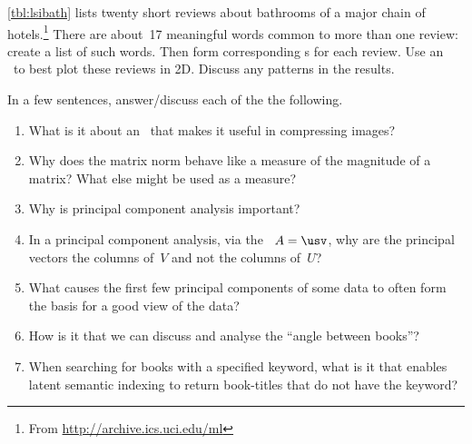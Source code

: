 \begin{exercise} \label{ex:lsibath} 
\autoref{tbl:lsibath} lists twenty short reviews about bathrooms of a major chain of hotels.\footnote{From \protect\url{http://archive.ics.uci.edu/ml}}
There are about~17 meaningful words common to more than one review: create a list of such words.
Then form corresponding s for each review.
Use an \svd\ to best plot these reviews in 2D.
Discuss any patterns in the results.
\end{exercise}






\begin{exercise} \label{ex:} 
In a few sentences, answer\slash discuss each of the the following.
\begin{enumerate}
\item What is it about an \svd\ that makes it useful in compressing images?

\item Why does the matrix norm behave like a measure of the magnitude of a matrix?  What else might be used as a measure?

\item Why is principal component analysis important?

\item In a principal component analysis, via the \svd\ \(A=\usv\), why are the principal vectors the columns of~\(V\) and not the columns of~\(U\)?

\item What causes the first few principal components of some data to often form the basis for a good view of the data?

\item How is it that we can discuss and analyse the ``angle between books''?

\item When searching for books with a specified keyword, what is it that enables latent semantic indexing to return book-titles that do not have the keyword? 

\end{enumerate}
\end{exercise}

\begin{comment}%
why, what caused X?
how did X occur?
what-if? what-if-not?
how does X compare with Y?
what is the evidence for X?
why is X important?
\end{comment}

\endinput%

